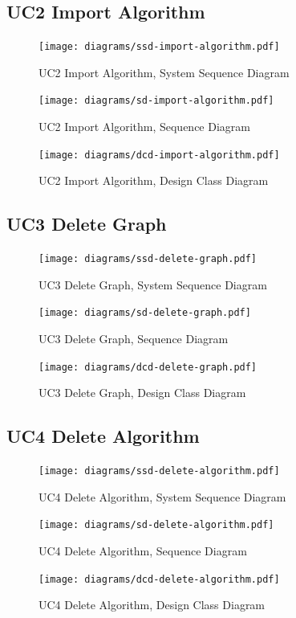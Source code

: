\subsection{UC2 Import Algorithm}
\begin{figure}[p]
    \centering
    \texttt{[image: diagrams/ssd-import-algorithm.pdf]}
    \caption{UC2 Import Algorithm, System Sequence Diagram}
    \label{fig:import-algorithm-ssd}
\end{figure}
\begin{figure}[p]
    \centering
    \texttt{[image: diagrams/sd-import-algorithm.pdf]}
    \caption{UC2 Import Algorithm, Sequence Diagram}
    \label{fig:import-algorithm-sd}
\end{figure}
\begin{figure}[p]
    \centering
    \texttt{[image: diagrams/dcd-import-algorithm.pdf]}
    \caption{UC2 Import Algorithm, Design Class Diagram}
    \label{fig:import-algorithm-dcd}
\end{figure}
% 
\subsection{UC3 Delete Graph}
\begin{figure}[p]
    \centering
    \texttt{[image: diagrams/ssd-delete-graph.pdf]}
    \caption{UC3 Delete Graph, System Sequence Diagram}
    \label{fig:delete-graph-ssd}
\end{figure}
\begin{figure}[p]
    \centering
    \texttt{[image: diagrams/sd-delete-graph.pdf]}
    \caption{UC3 Delete Graph, Sequence Diagram}
    \label{fig:delete-graph-sd}
\end{figure}
\begin{figure}[p]
    \centering
    \texttt{[image: diagrams/dcd-delete-graph.pdf]}
    \caption{UC3 Delete Graph, Design Class Diagram}
    \label{fig:delete-graph-dcd}
\end{figure}
% 
\subsection{UC4 Delete Algorithm}
\begin{figure}[p]
    \centering
    \texttt{[image: diagrams/ssd-delete-algorithm.pdf]}
    \caption{UC4 Delete Algorithm, System Sequence Diagram}
    \label{fig:delete-algorithm-ssd}
\end{figure}
\begin{figure}[p]
    \centering
    \texttt{[image: diagrams/sd-delete-algorithm.pdf]}
    \caption{UC4 Delete Algorithm, Sequence Diagram}
    \label{fig:delete-algorithm-sd}
\end{figure}
\begin{figure}[p]
    \centering
    \texttt{[image: diagrams/dcd-delete-algorithm.pdf]}
    \caption{UC4 Delete Algorithm, Design Class Diagram}
    \label{fig:delete-algorithm-dcd}
\end{figure}
% 
